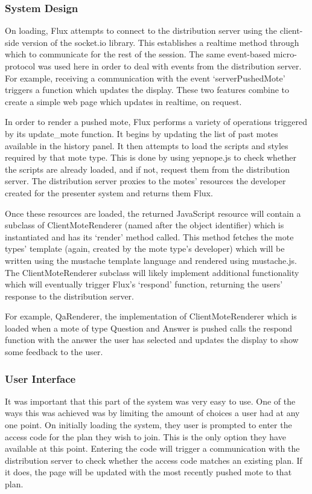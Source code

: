 \documentclass[a4papert,11pt,notitlepage]{article}
\begin{document}
\subsubsection{System Design}
On loading, Flux attempts to connect to the distribution server using the client-side version of the socket.io library. This establishes a realtime method through which to communicate for the rest of the session. The same event-based micro-protocol was used here in order to deal with events from the distribution server. For example, receiving a communication with the event `serverPushedMote' triggers a function which updates the display. These two features combine to create a simple web page which updates in realtime, on request.

In order to render a pushed mote, Flux performs a variety of operations triggered by its update\_mote function. It begins by updating the list of past motes available in the history panel. It then attempts to load the scripts and styles required by that mote type. This is done by using yepnope.js\cite{yepnope:web} to check whether the scripts are already loaded, and if not, request them from the distribution server. The distribution server proxies to the motes' resources the developer created for the presenter system and returns them Flux.

Once these resources are loaded, the returned JavaScript resource will contain a subclass of ClientMoteRenderer (named after the object identifier) which is instantiated and has its `render' method called. This method fetches the mote types' template (again, created by the mote type's developer) which will be written using the mustache\cite{mustache:web} template language and rendered using mustache.js\cite{mustachejs:web}. The ClientMoteRenderer subclass will likely implement additional functionality which will eventually trigger Flux's `respond' function, returning the users' response to the distribution server.

For example, QaRenderer, the implementation of ClientMoteRenderer which is loaded when a mote of type Question and Answer is pushed calls the respond function with the answer the user has selected and updates the display to show some feedback to the user.

\subsubsection{User Interface}
It was important that this part of the system was very easy to use. One of the ways this was achieved was by limiting the amount of choices a user had at any one point. On initially loading the system, they user is prompted to enter the access code for the plan they wish to join. This is the only option they have available at this point. Entering the code will trigger a communication with the distribution server to check whether the access code matches an existing plan. If it does, the page will be updated with the most recently pushed mote to that plan.
\end{document}
